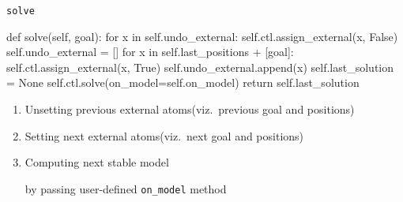 \begin{frame}[fragile]{\texttt{solve}}
\scriptsize
\begin{semiverbatim}
    def \alert<1>{solve}(self, goal):
        \alert<2>{for x in self.undo_external:}
            \alert<2>{self.ctl.\alert<6>{assign_external}(x, False)}
        \alert<3>{self.undo_external = []}
        \alert<3>{for x in self.last_positions + [goal]:}
            \alert<3>{self.ctl.\alert<6>{assign_external}(x, True)}
            \alert<3>{self.undo_external.append(x)}
        \alert<4>{self.last_solution = None}
        \alert<4>{self.ctl.\alert<6>{solve}(\alert<5>{\alert<6>{on_model}=self.on_model})}
        \alert<4>{return self.last_solution}
\end{semiverbatim}
\normalsize
\begin{enumerate}
\item<2-> Unsetting previous external atoms\hfill (viz.\ previous goal and positions)
\item<3-> Setting next external atoms\hfill (viz.\ next goal and positions)
\item<4-> Computing next stable model
  \par\pause[5] by passing user-defined \alert<5>{\texttt{on\_model}} method
\end{enumerate}
\end{frame}
